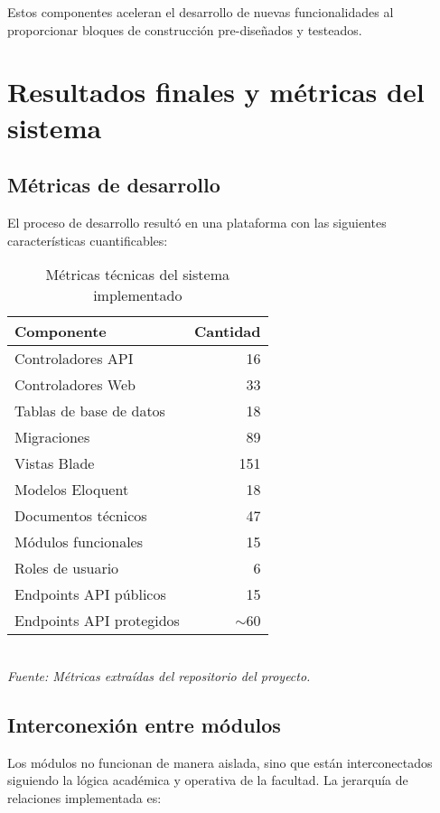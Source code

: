 Estos componentes aceleran el desarrollo de nuevas funcionalidades al proporcionar bloques de construcción pre-diseñados y testeados.

\section{Resultados finales y métricas del sistema}

\subsection{Métricas de desarrollo}

El proceso de desarrollo resultó en una plataforma con las siguientes características cuantificables:

\begin{table}[H]
\centering
\caption{Métricas técnicas del sistema implementado}
\label{tab:metricas-desarrollo}
\begin{tabular}{lr}
\toprule
\textbf{Componente} & \textbf{Cantidad} \\
\midrule
Controladores API & 16 \\
Controladores Web & 33 \\
Tablas de base de datos & 18 \\
Migraciones & 89 \\
Vistas Blade & 151 \\
Modelos Eloquent & 18 \\
Documentos técnicos & 47 \\
Módulos funcionales & 15 \\
Roles de usuario & 6 \\
Endpoints API públicos & 15 \\
Endpoints API protegidos & $\sim$60 \\
\bottomrule
\end{tabular}
\\[0.2cm]
\textit{Fuente: Métricas extraídas del repositorio del proyecto.}
\end{table}

\subsection{Interconexión entre módulos}

Los módulos no funcionan de manera aislada, sino que están interconectados siguiendo la lógica académica y operativa de la facultad. La jerarquía de relaciones implementada es:

